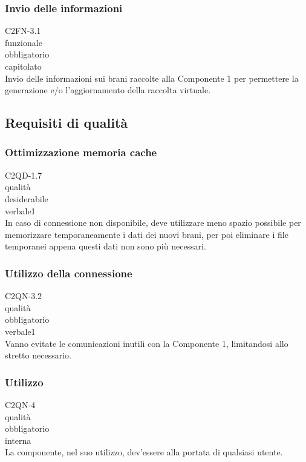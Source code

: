 \subsubsection*{Invio delle informazioni}
 C2FN-3.1 \\
 funzionale \\
 obbligatorio \\
 capitolato \\
Invio delle informazioni sui brani raccolte alla Componente 1 per permettere la
generazione e/o l'aggiornamento della raccolta virtuale.

\subsection{Requisiti di qualit\`a}
\subsubsection*{Ottimizzazione memoria cache}
 C2QD-1.7 \\
 qualit\`a \\
 desiderabile \\
 verbale1 \\
In caso di connessione non disponibile, deve utilizzare meno spazio possibile
per memorizzare temporaneamente i dati dei nuovi brani, per poi eliminare i file
temporanei appena questi dati non sono pi\`u necessari.

\subsubsection*{Utilizzo della connessione}
 C2QN-3.2 \\
 qualit\`a \\
 obbligatorio \\
 verbale1 \\
Vanno evitate le comunicazioni inutili con la Componente 1, limitandosi allo
stretto necessario.

\subsubsection*{Utilizzo}
 C2QN-4\\
 qualit\`a \\
 obbligatorio \\
 interna \\
La componente, nel suo utilizzo, dev'essere alla portata di qualsiasi utente.

